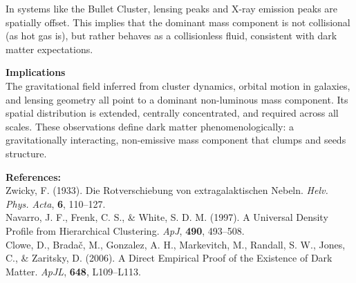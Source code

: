\begin{technical}
In systems like the Bullet Cluster, lensing peaks and X-ray emission peaks are spatially offset. This implies that the dominant mass component is not collisional (as hot gas is), but rather behaves as a collisionless fluid, consistent with dark matter expectations.

\noindent\textbf{Implications}\\[0.25em]
The gravitational field inferred from cluster dynamics, orbital motion in galaxies, and lensing geometry all point to a dominant non-luminous mass component. Its spatial distribution is extended, centrally concentrated, and required across all scales. These observations define dark matter phenomenologically: a gravitationally interacting, non-emissive mass component that clumps and seeds structure.

\vspace{0.5em}
\noindent\textbf{References:}\\
{\footnotesize
Zwicky, F. (1933). Die Rotverschiebung von extragalaktischen Nebeln. \textit{Helv. Phys. Acta}, \textbf{6}, 110--127.\\
Navarro, J. F., Frenk, C. S., \& White, S. D. M. (1997). A Universal Density Profile from Hierarchical Clustering. \textit{ApJ}, \textbf{490}, 493--508.\\
Clowe, D., Brada\v{c}, M., Gonzalez, A. H., Markevitch, M., Randall, S. W., Jones, C., \& Zaritsky, D. (2006). A Direct Empirical Proof of the Existence of Dark Matter. \textit{ApJL}, \textbf{648}, L109--L113.
}
\end{technical}
